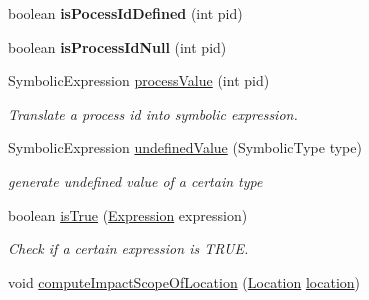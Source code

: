 \begin{DoxyCompactItemize}
\item 
\hypertarget{interfaceedu_1_1udel_1_1cis_1_1vsl_1_1civl_1_1model_1_1IF_1_1ModelFactory_a8c7515e4afa128e654104b2ccc5426d6}{}boolean {\bfseries is\+Pocess\+Id\+Defined} (int pid)\label{interfaceedu_1_1udel_1_1cis_1_1vsl_1_1civl_1_1model_1_1IF_1_1ModelFactory_a8c7515e4afa128e654104b2ccc5426d6}

\item 
\hypertarget{interfaceedu_1_1udel_1_1cis_1_1vsl_1_1civl_1_1model_1_1IF_1_1ModelFactory_a1e85a975ea6781923acaab9ca75b984c}{}boolean {\bfseries is\+Process\+Id\+Null} (int pid)\label{interfaceedu_1_1udel_1_1cis_1_1vsl_1_1civl_1_1model_1_1IF_1_1ModelFactory_a1e85a975ea6781923acaab9ca75b984c}

\item 
Symbolic\+Expression \hyperlink{interfaceedu_1_1udel_1_1cis_1_1vsl_1_1civl_1_1model_1_1IF_1_1ModelFactory_ac9c2af3dabac564bbcfb9ea8af132698}{process\+Value} (int pid)
\begin{DoxyCompactList}\small\item\em Translate a process id into symbolic expression. \end{DoxyCompactList}\item 
Symbolic\+Expression \hyperlink{interfaceedu_1_1udel_1_1cis_1_1vsl_1_1civl_1_1model_1_1IF_1_1ModelFactory_a5a797b0669cbf37dad02636151e7f212}{undefined\+Value} (Symbolic\+Type type)
\begin{DoxyCompactList}\small\item\em generate undefined value of a certain type \end{DoxyCompactList}\item 
boolean \hyperlink{interfaceedu_1_1udel_1_1cis_1_1vsl_1_1civl_1_1model_1_1IF_1_1ModelFactory_a4c8ce285773fb24eb402092efb55fe11}{is\+True} (\hyperlink{interfaceedu_1_1udel_1_1cis_1_1vsl_1_1civl_1_1model_1_1IF_1_1expression_1_1Expression}{Expression} expression)
\begin{DoxyCompactList}\small\item\em Check if a certain expression is T\+R\+U\+E. \end{DoxyCompactList}\item 
void \hyperlink{interfaceedu_1_1udel_1_1cis_1_1vsl_1_1civl_1_1model_1_1IF_1_1ModelFactory_a63f9e8828c6bfd7b0b42e0aae1d2192c}{compute\+Impact\+Scope\+Of\+Location} (\hyperlink{interfaceedu_1_1udel_1_1cis_1_1vsl_1_1civl_1_1model_1_1IF_1_1location_1_1Location}{Location} \hyperlink{interfaceedu_1_1udel_1_1cis_1_1vsl_1_1civl_1_1model_1_1IF_1_1ModelFactory_aad8d7d824f70425060e06c1bbc3ee7a3}{location})

\end{DoxyCompactItemize}
